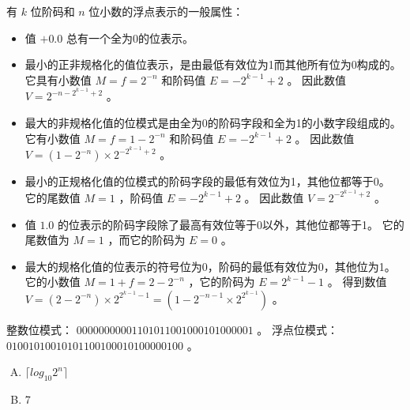 {{        有 $k$ 位阶码和 $n$ 位小数的浮点表示的一般属性：

        \begin{itemize}
            \item 值 $+0.0$ 总有一个全为0的位表示。
            \item
            {
                最小的正非规格化的值位表示，是由最低有效位为1而其他所有位为0构成的。
                它具有小数值 $M = f = 2^{-n}$ 和阶码值 $E = -2^{k - 1} + 2$ 。
                因此数值 $V = 2^{-n - 2^{k - 1} + 2}$ 。
            }
            \item
            {
                最大的非规格化值的位模式是由全为0的阶码字段和全为1的小数字段组成的。
                它有小数值 $M = f = 1 - 2^{-n}$ 和阶码值 $E = -2^{k - 1} + 2$ 。
                因此数值 $V = (1 - 2^{-n}) \times 2^{-2^{k - 1} + 2}$ 。
            }
            \item
            {
                最小的正规格化值的位模式的阶码字段的最低有效位为1，其他位都等于0。
                它的尾数值 $M = 1$ ，阶码值 $E = -2^{k - 1} + 2$ 。
                因此数值 $V = 2^{-2^{k - 1} + 2}$ 。
            }
            \item
            {
                值 $1.0$ 的位表示的阶码字段除了最高有效位等于0以外，其他位都等于1。
                它的尾数值为 $M = 1$ ，而它的阶码为 $E = 0$ 。
            }
            \item
            {
                最大的规格化值的位表示的符号位为0，阶码的最低有效位为0，其他位为1。
                它的小数值 $M = 1 + f = 2 - 2^{-n}$ ，它的阶码为 $E = 2^{k - 1} - 1$ 。
                得到数值 $V = (2 - 2^{-n}) \times 2^{2^{k - 1} - 1} = (1 - 2^{-n - 1} \times 2^{2^{k - 1}})$ 。
            }
        \end{itemize}

        \begin{practicec}
            整数位模式： $00000000001 101011001000101000001$ 。
            浮点位模式： $ 0 10010100 10101100100010100000100$ 。
        \end{practicec}

        \begin{practicec}
            \begin{enumerate}[A.]
                \item $\lceil log_{10} 2^n \rceil$
                \item 7
            \end{enumerate}
        \end{practicec}
    }

}
